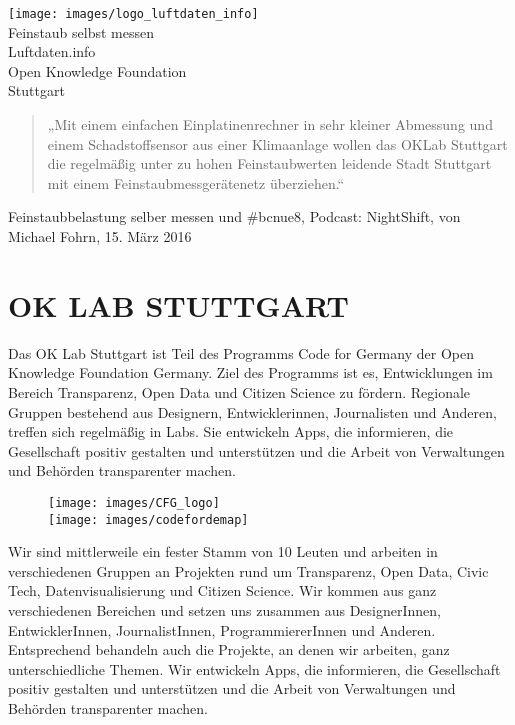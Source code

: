 \documentclass[
notumble,
]{leaflet}
\begin{document}
\color{LDGREEN}
\begin{center}
\texttt{[image: images/logo\_luftdaten\_info]}
\\[2em]
\sffamily
\huge
Feinstaub selbst messen
\\[1em]
Luftdaten.info
\\[1em]
Open Knowledge Foundation 
\\
Stuttgart
\normalsize 
\normalfont
\end{center}
\color{black}

\newpage


\begin{quote}
„Mit einem einfachen Einplatinenrechner in sehr kleiner Abmessung und einem Schadstoffsensor aus einer Klimaanlage wollen das OKLab Stuttgart die regelmäßig unter zu hohen Feinstaubwerten leidende Stadt Stuttgart mit einem Feinstaubmessgerätenetz überziehen.“
\end{quote}
\raggedright{Feinstaubbelastung selber messen und \#bcnue8, Podcast: NightShift, von Michael Fohrn, 15. März 2016}


\section{OK LAB STUTTGART}

Das OK Lab Stuttgart ist Teil des Programms Code for Germany der Open Knowledge Foundation Germany. Ziel des Programms ist es, Entwicklungen im Bereich Transparenz, Open Data und Citizen Science zu fördern. Regionale Gruppen bestehend aus Designern, Entwicklerinnen, Journalisten und Anderen, treffen sich regelmäßig in Labs. Sie entwickeln Apps, die informieren, die Gesellschaft positiv gestalten und unterstützen und die Arbeit von Verwaltungen und Behörden transparenter machen.

\begin{figure}
\noindent\texttt{[image: images/CFG\_logo]}\\
\noindent\texttt{[image: images/codefordemap]}
\end{figure}

Wir sind mittlerweile ein fester Stamm von 10 Leuten und arbeiten in verschiedenen Gruppen an Projekten rund um Transparenz, Open Data, Civic Tech, Datenvisualisierung und Citizen Science. Wir kommen aus ganz verschiedenen Bereichen und setzen uns zusammen aus DesignerInnen, EntwicklerInnen, JournalistInnen, ProgrammiererInnen und Anderen. Entsprechend behandeln auch die Projekte, an denen wir arbeiten, ganz unterschiedliche Themen. Wir entwickeln Apps, die informieren, die Gesellschaft positiv gestalten und unterstützen und die Arbeit von Verwaltungen und Behörden transparenter machen.
\end{document}
